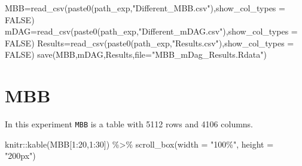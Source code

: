 \documentclass[
  letterpaper,
  DIV=11,
  numbers=noendperiod]{scrreprt}
\newenvironment{Shaded}{\begin{snugshade}}{\end{snugshade}}
\newcommand{\AttributeTok}[1]{\textcolor[rgb]{0.40,0.45,0.13}{#1}}
\newcommand{\ConstantTok}[1]{\textcolor[rgb]{0.56,0.35,0.01}{#1}}
\newcommand{\DecValTok}[1]{\textcolor[rgb]{0.68,0.00,0.00}{#1}}
\newcommand{\FunctionTok}[1]{\textcolor[rgb]{0.28,0.35,0.67}{#1}}
\newcommand{\NormalTok}[1]{\textcolor[rgb]{0.00,0.23,0.31}{#1}}
\newcommand{\OtherTok}[1]{\textcolor[rgb]{0.00,0.23,0.31}{#1}}
\newcommand{\SpecialCharTok}[1]{\textcolor[rgb]{0.37,0.37,0.37}{#1}}
\newcommand{\StringTok}[1]{\textcolor[rgb]{0.13,0.47,0.30}{#1}}
\begin{document}
\begin{Shaded}
\begin{Highlighting}[]
\NormalTok{MBB}\OtherTok{=}\FunctionTok{read\_csv}\NormalTok{(}\FunctionTok{paste0}\NormalTok{(path\_exp,}\StringTok{"Different\_MBB.csv"}\NormalTok{),}\AttributeTok{show\_col\_types =} \ConstantTok{FALSE}\NormalTok{)}
\NormalTok{mDAG}\OtherTok{=}\FunctionTok{read\_csv}\NormalTok{(}\FunctionTok{paste0}\NormalTok{(path\_exp,}\StringTok{"Different\_mDAG.csv"}\NormalTok{),}\AttributeTok{show\_col\_types =} \ConstantTok{FALSE}\NormalTok{)}
\NormalTok{Results}\OtherTok{=}\FunctionTok{read\_csv}\NormalTok{(}\FunctionTok{paste0}\NormalTok{(path\_exp,}\StringTok{"Results.csv"}\NormalTok{),}\AttributeTok{show\_col\_types =} \ConstantTok{FALSE}\NormalTok{)}
\FunctionTok{save}\NormalTok{(MBB,mDAG,Results,}\AttributeTok{file=}\StringTok{"MBB\_mDag\_Results.Rdata"}\NormalTok{)}
\end{Highlighting}
\end{Shaded}

\hypertarget{mbb}{%
\section*{MBB}\label{mbb}}


In this experiment \texttt{MBB} is a table with 5112 rows and 4106
columns.

\begin{Shaded}
\begin{Highlighting}[]
\NormalTok{knitr}\SpecialCharTok{::}\FunctionTok{kable}\NormalTok{(MBB[}\DecValTok{1}\SpecialCharTok{:}\DecValTok{20}\NormalTok{,}\DecValTok{1}\SpecialCharTok{:}\DecValTok{30}\NormalTok{]) }\SpecialCharTok{\%\textgreater{}\%}   \FunctionTok{scroll\_box}\NormalTok{(}\AttributeTok{width =} \StringTok{"100\%"}\NormalTok{, }\AttributeTok{height =} \StringTok{"200px"}\NormalTok{)}
\end{Highlighting}
\end{Shaded}
\end{document}
